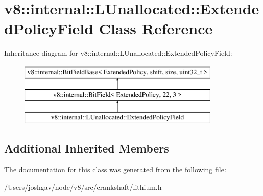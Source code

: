 \hypertarget{classv8_1_1internal_1_1_l_unallocated_1_1_extended_policy_field}{}\section{v8\+:\+:internal\+:\+:L\+Unallocated\+:\+:Extended\+Policy\+Field Class Reference}
\label{classv8_1_1internal_1_1_l_unallocated_1_1_extended_policy_field}
Inheritance diagram for v8\+:\+:internal\+:\+:L\+Unallocated\+:\+:Extended\+Policy\+Field\+:\begin{figure}[H]
\begin{center}
\leavevmode
\includegraphics[height=3.000000cm]{classv8_1_1internal_1_1_l_unallocated_1_1_extended_policy_field}
\end{center}
\end{figure}
\subsection*{Additional Inherited Members}


The documentation for this class was generated from the following file\+:\begin{DoxyCompactItemize}
\item 
/\+Users/joshgav/node/v8/src/crankshaft/lithium.\+h\end{DoxyCompactItemize}
